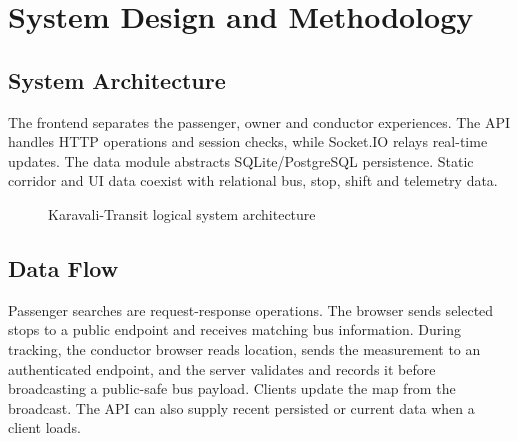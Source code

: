 \documentclass[12pt,a4paper]{report}
\begin{document}
\chapter{System Design and Methodology}
\section{System Architecture}
The frontend separates the passenger, owner and conductor experiences. The API handles HTTP operations and session checks, while Socket.IO relays real-time updates. The data module abstracts SQLite/PostgreSQL persistence. Static corridor and UI data coexist with relational bus, stop, shift and telemetry data.

\begin{figure}[tbp]\centering
{}\caption{Karavali-Transit logical system architecture}\label{fig:architecture}\end{figure}

\section{Data Flow}
Passenger searches are request-response operations. The browser sends selected stops to a public endpoint and receives matching bus information. During tracking, the conductor browser reads location, sends the measurement to an authenticated endpoint, and the server validates and records it before broadcasting a public-safe bus payload. Clients update the map from the broadcast. The API can also supply recent persisted or current data when a client loads.
\end{document}
